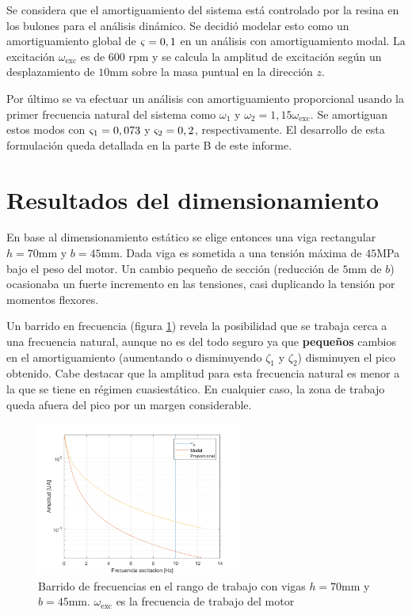\documentclass[onecolumn,10pt,titlepage,a4paper]{article}
\begin{document}
Se considera que el amortiguamiento del sistema está controlado por la resina en los bulones para el análisis dinámico. Se decidió modelar esto como un amortiguamiento global de $\varsigma = 0,1$ en un análisis con amortiguamiento modal. La excitación $\omega_{\mathrm{exc}}$ es de 600 rpm y se calcula la amplitud de excitación según un desplazamiento de $10$mm sobre la masa puntual en la dirección $z$.

Por último se va efectuar un análisis con amortiguamiento proporcional usando la primer frecuencia natural del sistema como $\omega_1$ y $\omega_2 = 1,15 \omega_{\mathrm{exc}}$. Se amortiguan estos modos con $\varsigma_{1}=0,073$ y $\varsigma_2=0,2$, respectivamente. El desarrollo de esta formulación queda detallada en la parte B de este informe.

\section{Resultados del dimensionamiento}
En base al dimensionamiento estático se elige entonces una viga rectangular $h=70\si{\milli \meter}$ y $b=45\si{\milli \meter}$. Dada viga es sometida a una tensión máxima de $45$MPa bajo el peso del motor. Un cambio pequeño de sección (reducción de $5$mm de $b$) ocasionaba un fuerte incremento en las tensiones, casi duplicando la tensión por momentos flexores.

Un barrido en frecuencia (figura \ref{fig:sinesweepA}) revela la posibilidad que se trabaja cerca a una frecuencia natural, aunque no es del todo seguro ya que \textbf{pequeños} cambios en el amortiguamiento (aumentando o disminuyendo $\zeta_1$ y $\zeta_2$) disminuyen el pico obtenido. Cabe destacar que la amplitud para esta frecuencia natural es menor a la que se tiene en régimen cuasiestático. En cualquier caso, la zona de trabajo queda afuera del pico por un margen considerable.




\begin{figure}[htb!]
	\centering
	\includegraphics[width=0.6\textwidth]{fig/sinesweep1.png}
	\caption{Barrido de frecuencias en el rango de trabajo con vigas $h=70$mm y $b=45$mm. $\omega_{\mathrm{exc}}$ es la frecuencia de trabajo del motor}
	\label{fig:sinesweepA}
\end{figure}
\end{document}
